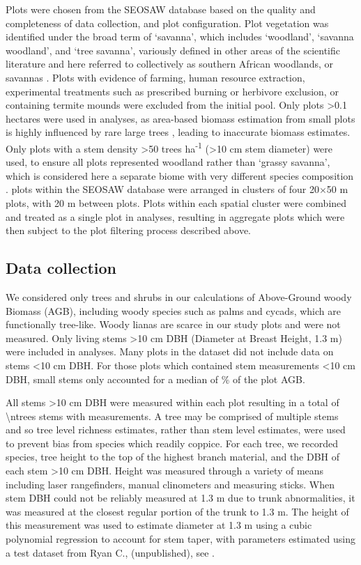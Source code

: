 \begin{refsection}
Plots were chosen from the SEOSAW database based on the quality and completeness of data collection, and plot configuration. Plot vegetation was identified under the broad term of `savanna', which includes `woodland', `savanna woodland', and `tree savanna', variously defined in other areas of the scientific literature and here referred to collectively as southern African woodlands, or savannas \citep{Ratnam2011, Hill2010}. Plots with evidence of farming, human resource extraction, experimental treatments such as prescribed burning or herbivore exclusion, or containing termite mounds were excluded from the initial pool. Only plots >0.1 hectares were used in analyses, as area-based biomass estimation from small plots is highly influenced by rare large trees \citep{Stegen2011}, leading to inaccurate biomass estimates. Only plots with a stem density >50 trees ha\textsuperscript{-1} (>10 cm stem diameter) were used, to ensure all plots represented woodland rather than `grassy savanna', which is considered here a separate biome with very different species composition \citep{Parr2014}. \nzam{} plots within the SEOSAW database were arranged in clusters of four 20$\times$50 m plots, with 20 m between plots. Plots within each spatial cluster were combined and treated as a single plot in analyses, resulting in \nzamcluster{} aggregate plots which were then subject to the plot filtering process described above.

\subsection{Data collection}
\label{befr:ssec:data}
 
We considered only trees and shrubs in our calculations of Above-Ground woody Biomass (AGB), including woody species such as palms and cycads, which are functionally tree-like. Woody lianas are scarce in our study plots and were not measured. Only living stems >10 cm DBH (Diameter at Breast Height, 1.3 m) were included in analyses. Many plots in the dataset did not include data on stems <10 cm DBH. For those plots which contained stem measurements <10 cm DBH, small stems only accounted for a median of \percsmallagb{}\% of the plot AGB. 

All stems >10 cm DBH were measured within each plot resulting in a total of \num[group-separator={,}]{\ntrees} stems with measurements. A tree may be comprised of multiple stems and so tree level richness estimates, rather than stem level estimates, were used to prevent bias from species which readily coppice. For each tree, we recorded species, tree height to the top of the highest branch material, and the DBH of each stem >10 cm DBH. Height was measured through a variety of means including laser rangefinders, manual clinometers and measuring sticks. When stem DBH could not be reliably measured at 1.3 m due to trunk abnormalities, it was measured at the closest regular portion of the trunk to 1.3 m. The height of this measurement was used to estimate diameter at 1.3 m using a cubic polynomial regression to account for stem taper, with parameters estimated using a test dataset from Ryan C., (unpublished), see \citet{Godlee2020}. 


\end{refsection}
